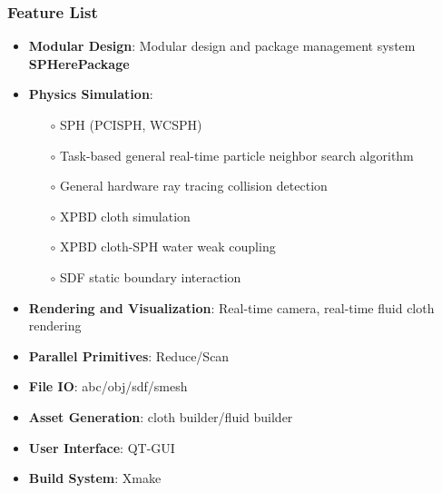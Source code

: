 \begin{frame}
    \frametitle{Feature List}
    \begin{itemize}
        \item \textbf{Modular Design}: Modular design and package management system \textbf{SPHerePackage}
        \item \textbf{Physics Simulation}:
              \begin{itemize}
                  \item[$\circ$]SPH (PCISPH, WCSPH)
                  \item[$\circ$]Task-based general real-time particle neighbor search algorithm
                  \item[$\circ$]General hardware ray tracing collision detection
                  \item[$\circ$]XPBD cloth simulation
                  \item[$\circ$]XPBD cloth-SPH water weak coupling
                  \item[$\circ$]SDF static boundary interaction
              \end{itemize}
        \item \textbf{Rendering and Visualization}: Real-time camera, real-time fluid cloth rendering
        \item \textbf{Parallel Primitives}: Reduce/Scan
        \item \textbf{File IO}: abc/obj/sdf/smesh
        \item \textbf{Asset Generation}: cloth builder/fluid builder
        \item \textbf{User Interface}: QT-GUI
        \item \textbf{Build System}: Xmake
    \end{itemize}
\end{frame}